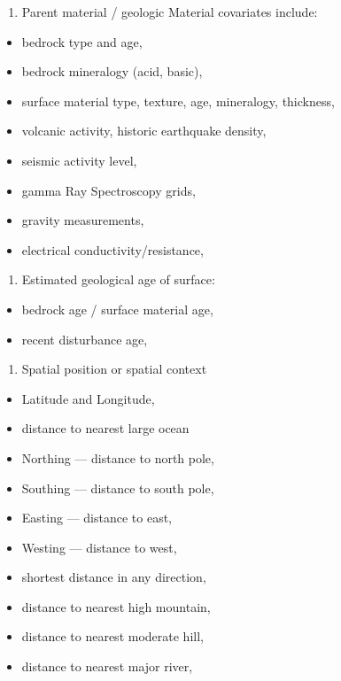\documentclass[graybox,natbib,nospthms,UStrade]{svmono}
\providecommand{\tightlist}{%
  \setlength{\itemsep}{0pt}\setlength{\parskip}{0pt}}
\providecommand{\tightlist}{\setlength{\itemsep}{0pt}\setlength{\parskip}{0pt}}
\begin{document}
\begin{enumerate}
\def\labelenumi{\arabic{enumi}.}
\setcounter{enumi}{3}
\tightlist
\item
  Parent material / geologic Material covariates include:
\end{enumerate}

\begin{itemize}
\tightlist
\item
  bedrock type and age,
\item
  bedrock mineralogy (acid, basic),
\item
  surface material type, texture, age, mineralogy, thickness,
\item
  volcanic activity, historic earthquake density,
\item
  seismic activity level,
\item
  gamma Ray Spectroscopy grids,
\item
  gravity measurements,
\item
  electrical conductivity/resistance,
\end{itemize}

\begin{enumerate}
\def\labelenumi{\arabic{enumi}.}
\setcounter{enumi}{4}
\tightlist
\item
  Estimated geological age of surface:
\end{enumerate}

\begin{itemize}
\tightlist
\item
  bedrock age / surface material age,
\item
  recent disturbance age,
\end{itemize}

\begin{enumerate}
\def\labelenumi{\arabic{enumi}.}
\setcounter{enumi}{5}
\tightlist
\item
  Spatial position or spatial context
\end{enumerate}

\begin{itemize}
\tightlist
\item
  Latitude and Longitude,
\item
  distance to nearest large ocean
\item
  Northing --- distance to north pole,
\item
  Southing --- distance to south pole,
\item
  Easting --- distance to east,
\item
  Westing --- distance to west,
\item
  shortest distance in any direction,
\item
  distance to nearest high mountain,
\item
  distance to nearest moderate hill,
\item
  distance to nearest major river,
\end{itemize}
\end{document}
